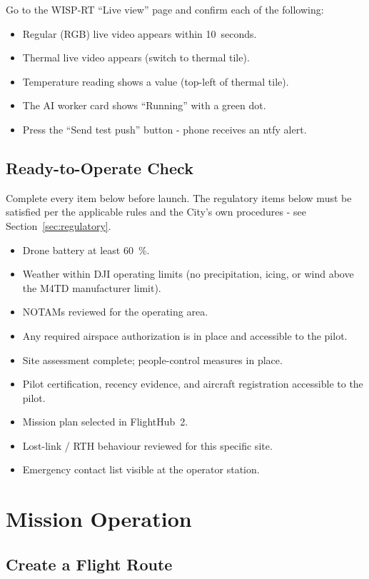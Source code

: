 \documentclass[11pt,letterpaper]{article}
\newcommand{\chk}{\item[$\Box$]}
\begin{document}
Go to the WISP-RT ``Live view'' page and confirm each of the following:

\begin{itemize}[leftmargin=1.5em]
  \chk Regular (RGB) live video appears within 10~seconds.
  \chk Thermal live video appears (switch to thermal tile).
  \chk Temperature reading shows a value (top-left of thermal tile).
  \chk The AI worker card shows ``Running'' with a green dot.
  \chk Press the ``Send test push'' button - phone receives an ntfy alert.
\end{itemize}

\subsection{Ready-to-Operate Check}

Complete every item below before launch. The regulatory items below
must be satisfied per the applicable rules and the City's own
procedures - see Section~\ref{sec:regulatory}.

\begin{itemize}[leftmargin=1.5em]
  \chk Drone battery at least 60~\%.
  \chk Weather within DJI operating limits (no precipitation, icing, or wind above the M4TD manufacturer limit).
  \chk NOTAMs reviewed for the operating area.
  \chk Any required airspace authorization is in place and accessible to the pilot.
  \chk Site assessment complete; people-control measures in place.
  \chk Pilot certification, recency evidence, and aircraft registration accessible to the pilot.
  \chk Mission plan selected in FlightHub~2.
  \chk Lost-link / RTH behaviour reviewed for this specific site.
  \chk Emergency contact list visible at the operator station.
\end{itemize}

\newpage
\section{Mission Operation}

\subsection{Create a Flight Route}
\end{document}
